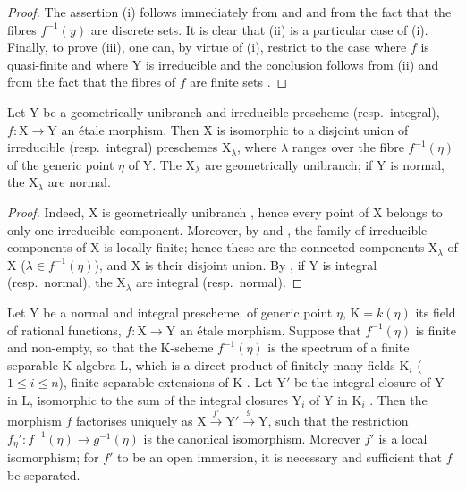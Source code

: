 \begin{proof}
The assertion (i) follows immediately from  and  and from the fact that the fibres $f^{-1}(y)$ are discrete sets.
It is clear that (ii) is a particular case of (i).
Finally, to prove (iii), one can, by virtue of (i), restrict to the case where $f$ is quasi-finite and where $\mathrm{Y}$ is irreducible  and the conclusion follows from (ii) and from the fact that the fibres of $f$ are finite sets .
\end{proof}

\begin{proposition}[18.10.7]
\label{IV.18.10.7}
Let $\mathrm{Y}$ be a geometrically unibranch and irreducible prescheme (resp.\ integral), $f:\mathrm{X}\to\mathrm{Y}$ an \'etale morphism.
Then $\mathrm{X}$ is isomorphic to a disjoint union of irreducible (resp.\ integral) preschemes $\mathrm{X}_\lambda$, where $\lambda$ ranges over the fibre $f^{-1}(\eta)$ of the generic point $\eta$ of $\mathrm{Y}$.
The $\mathrm{X}_\lambda$ are geometrically unibranch; if $\mathrm{Y}$ is normal, the $\mathrm{X}_\lambda$ are normal.
\end{proposition}

\begin{proof}
Indeed, $\mathrm{X}$ is geometrically unibranch , hence every point of $\mathrm{X}$ belongs to only one irreducible component. Moreover, by  and , the family of irreducible components of $\mathrm{X}$ is locally finite; hence  these are the connected components $\mathrm{X}_\lambda$ of $\mathrm{X}$ ($\lambda\in f^{-1}(\eta)$), and $\mathrm{X}$ is their disjoint union. By , if $\mathrm{Y}$ is integral (resp.\ normal), the $\mathrm{X}_\lambda$ are integral (resp.\ normal).
\end{proof}

\begin{proposition}[18.10.8]
\label{IV.18.10.8}
Let $\mathrm{Y}$ be a normal and integral prescheme, of generic point $\eta$, $\mathrm{K}=k(\eta)$ its field of rational functions, $f:\mathrm{X}\to\mathrm{Y}$ an \'etale morphism.
Suppose that $f^{-1}(\eta)$ is finite and non-empty, so that the $\mathrm{K}$-scheme $f^{-1}(\eta)$ is the spectrum of a finite separable $\mathrm{K}$-algebra $\mathrm{L}$, which is a direct product of finitely many fields $\mathrm{K}_i$ ($1\leq i\leq n$), finite separable extensions of $\mathrm{K}$ .
Let $\mathrm{Y}'$ be the integral closure of $\mathrm{Y}$ in $\mathrm{L}$, isomorphic to the sum of the integral closures $\mathrm{Y}_i$ of $\mathrm{Y}$ in $\mathrm{K}_i$ .
Then the morphism $f$ factorises uniquely as $\mathrm{X}\xrightarrow{f'}\mathrm{Y}'\xrightarrow{g}\mathrm{Y}$, such that the restriction $f_\eta':f^{-1}(\eta)\to g^{-1}(\eta)$ is the canonical isomorphism.
Moreover $f'$ is a local isomorphism; for $f'$ to be an open immersion, it is necessary and sufficient that $f$ be separated.
\end{proposition}

